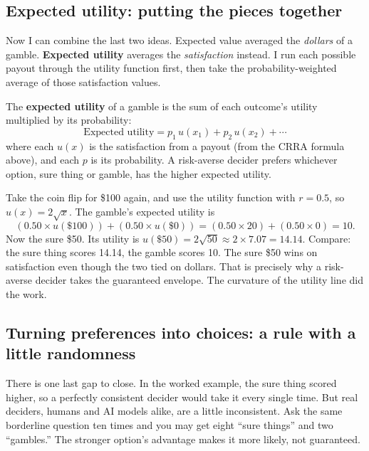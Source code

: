 \documentclass[11pt]{article}
\newcommand{\term}[1]{\textbf{\color{mossdk}#1}}
\begin{document}
\subsection{Expected utility: putting the pieces together}

Now I can combine the last two ideas. Expected value averaged the \emph{dollars} of a gamble.
\term{Expected utility} averages the \emph{satisfaction} instead. I run each possible payout through
the utility function first, then take the probability-weighted average of those satisfaction values.

\begin{defbox}
The \term{expected utility} of a gamble is the sum of each outcome's utility multiplied by its
probability:
\[
\text{Expected utility} = p_1 \, u(x_1) + p_2 \, u(x_2) + \cdots
\]
where each $u(x)$ is the satisfaction from a payout (from the CRRA formula above), and each $p$ is its
probability. A risk-averse decider prefers whichever option, sure thing or gamble, has the higher
expected utility.
\end{defbox}

\begin{workbox}
Take the coin flip for \$100 again, and use the utility function with $r = 0.5$, so $u(x) = 2\sqrt{x}$.
The gamble's expected utility is
\[
(0.50 \times u(\$100)) + (0.50 \times u(\$0)) = (0.50 \times 20) + (0.50 \times 0) = 10.
\]
Now the sure \$50. Its utility is $u(\$50) = 2\sqrt{50} \approx 2 \times 7.07 = 14.14$. Compare: the
sure thing scores 14.14, the gamble scores 10. The sure \$50 wins on satisfaction even though the two
tied on dollars. That is precisely why a risk-averse decider takes the guaranteed envelope. The
curvature of the utility line did the work.
\end{workbox}

\subsection{Turning preferences into choices: a rule with a little randomness}

There is one last gap to close. In the worked example, the sure thing scored higher, so a perfectly
consistent decider would take it every single time. But real deciders, humans and AI models alike, are
a little inconsistent. Ask the same borderline question ten times and you may get eight ``sure things''
and two ``gambles.'' The stronger option's advantage makes it more likely, not guaranteed.
\end{document}

